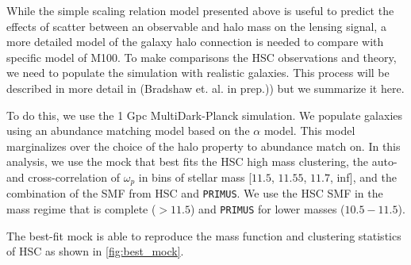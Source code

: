 \documentclass[a4paper,fleqn,usenatbib]{mnras}
\begin{document}
    
    While the simple scaling relation model presented above is useful to predict the effects of
    scatter between an observable and halo mass on the lensing signal, a more detailed model of the
    galaxy halo connection is needed to compare with specific model of M100. To make comparisons the
    HSC observations and theory, we need to populate the simulation with realistic galaxies. This
    process will be described in more detail in (Bradshaw et. al. in prep.)) but we summarize
    it here.
    
    To do this, we use the 1 Gpc MultiDark-Planck simulation. We populate galaxies using an abundance
    matching model based on the \citet{Lehmann2017} $\alpha$ model. This model marginalizes over the
    choice of the halo property to abundance match on. In this analysis, we use the mock that best
    fits the HSC high mass clustering, the auto- and cross-correlation of $\omega_p$ in bins of
    stellar mass [$11.5$, $11.55$, $11.7$, inf], and the combination of the SMF from HSC and 
    \texttt{PRIMUS}.
    We use the HSC SMF in the mass regime that is complete ($> 11.5$) and \texttt{PRIMUS} for 
    lower masses ($10.5 - 11.5$).
    
    The best-fit mock is able to reproduce the mass function and clustering statistics of HSC as
    shown in \ref{fig:best_mock}.
\end{document}
